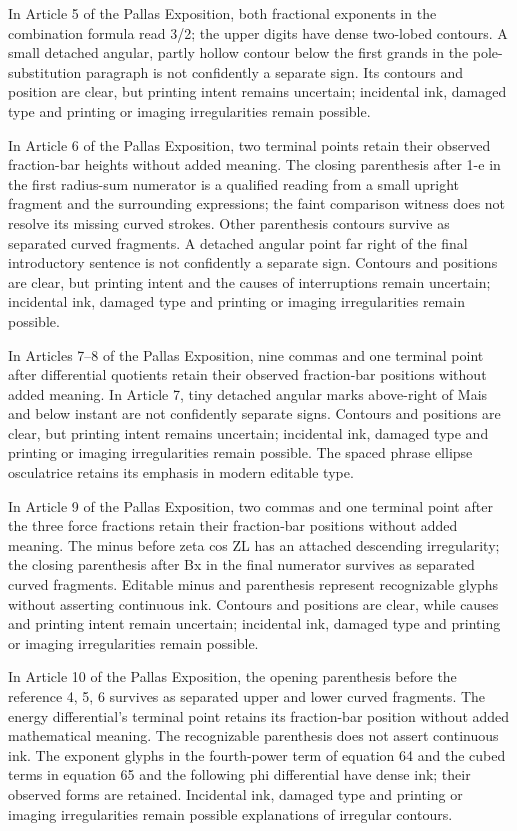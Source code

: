 In Article 5 of the Pallas Exposition, both fractional exponents in the combination formula read 3/2; the upper digits have dense two-lobed contours. A small detached angular, partly hollow contour below the first grands in the pole-substitution paragraph is not confidently a separate sign. Its contours and position are clear, but printing intent remains uncertain; incidental ink, damaged type and printing or imaging irregularities remain possible.

In Article 6 of the Pallas Exposition, two terminal points retain their observed fraction-bar heights without added meaning. The closing parenthesis after 1-e in the first radius-sum numerator is a qualified reading from a small upright fragment and the surrounding expressions; the faint comparison witness does not resolve its missing curved strokes. Other parenthesis contours survive as separated curved fragments. A detached angular point far right of the final introductory sentence is not confidently a separate sign. Contours and positions are clear, but printing intent and the causes of interruptions remain uncertain; incidental ink, damaged type and printing or imaging irregularities remain possible.

In Articles 7–8 of the Pallas Exposition, nine commas and one terminal point after differential quotients retain their observed fraction-bar positions without added meaning. In Article 7, tiny detached angular marks above-right of Mais and below instant are not confidently separate signs. Contours and positions are clear, but printing intent remains uncertain; incidental ink, damaged type and printing or imaging irregularities remain possible. The spaced phrase ellipse osculatrice retains its emphasis in modern editable type.

In Article 9 of the Pallas Exposition, two commas and one terminal point after the three force fractions retain their fraction-bar positions without added meaning. The minus before zeta cos ZL has an attached descending irregularity; the closing parenthesis after Bx in the final numerator survives as separated curved fragments. Editable minus and parenthesis represent recognizable glyphs without asserting continuous ink. Contours and positions are clear, while causes and printing intent remain uncertain; incidental ink, damaged type and printing or imaging irregularities remain possible.

In Article 10 of the Pallas Exposition, the opening parenthesis before the reference 4, 5, 6 survives as separated upper and lower curved fragments. The energy differential’s terminal point retains its fraction-bar position without added mathematical meaning. The recognizable parenthesis does not assert continuous ink. The exponent glyphs in the fourth-power term of equation 64 and the cubed terms in equation 65 and the following phi differential have dense ink; their observed forms are retained. Incidental ink, damaged type and printing or imaging irregularities remain possible explanations of irregular contours.

